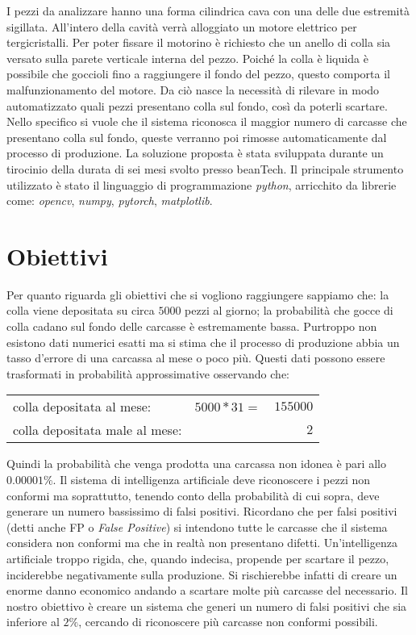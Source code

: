 \documentclass[a0,portrait]{a0poster}
\begin{document}
\begin{multicols}{2}
I pezzi da analizzare hanno una forma cilindrica cava con una delle due estremità sigillata.
All'intero della cavità verrà alloggiato un motore elettrico per tergicristalli.
Per poter fissare il motorino è richiesto che un anello di colla sia versato sulla parete verticale interna del pezzo.
Poiché la colla è liquida è possibile che goccioli fino a raggiungere il fondo del pezzo, questo comporta il malfunzionamento del motore.
Da ciò nasce la necessità di rilevare in modo automatizzato quali pezzi presentano colla sul fondo, così da poterli scartare.
Nello specifico si vuole che il sistema riconosca il maggior numero di carcasse che presentano colla sul fondo, queste verranno poi rimosse automaticamente dal processo di produzione.
La soluzione proposta è stata sviluppata durante un tirocinio della durata di sei mesi svolto presso beanTech.
Il principale strumento utilizzato è stato il linguaggio di programmazione \textit{python}, arricchito da librerie come: \textit{opencv}, \textit{numpy}, \textit{pytorch}, \textit{matplotlib}.


\section*{Obiettivi}
Per quanto riguarda gli obiettivi che si vogliono raggiungere sappiamo che:
la colla viene depositata su circa $5000$ pezzi al giorno;
la probabilità che gocce di colla cadano sul fondo delle carcasse è estremamente bassa.
Purtroppo non esistono dati numerici esatti ma si stima che il processo di produzione abbia un tasso d'errore di una carcassa al mese o poco più.
Questi dati possono essere trasformati in probabilità approssimative osservando che:
\begin{center}
  \begin{tabular}{ l c r }
    colla depositata al mese: & $5000 * 31 =$& $155000$ \\
    colla depositata male al mese: && $2$
  \end{tabular}
\end{center}
Quindi la probabilità che venga prodotta una carcassa non idonea è pari allo $0.00001\%$.
Il sistema di intelligenza artificiale deve riconoscere i pezzi non conformi ma soprattutto, tenendo conto della probabilità di cui sopra, deve generare un numero bassissimo di falsi positivi.
Ricordano che per falsi positivi (detti anche FP o \textit{False Positive}) si intendono tutte le carcasse che il sistema considera non conformi ma che in realtà non presentano difetti.
Un'intelligenza artificiale troppo rigida, che, quando indecisa, propende per scartare il pezzo, inciderebbe negativamente sulla produzione.
Si rischierebbe infatti di creare un enorme danno economico andando a scartare molte più carcasse del necessario.
Il nostro obiettivo è creare un sistema che generi un numero di falsi positivi che sia inferiore al $2\%$, cercando di riconoscere più carcasse non conformi possibili.


\end{multicols}
\end{document}
